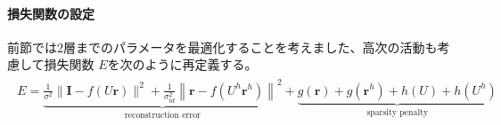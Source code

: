 \documentclass[letterpaper,10pt,english]{sphinxmanual}
\begin{document}
\paragraph{損失関数の設定}
\label{\detokenize{11-3_predictive-coding-rao:id3}}
前節では2層までのパラメータを最適化することを考えました、高次の活動も考慮して損失関数 \(E\)を次のように再定義する。
\begin{equation*}
\begin{split}
\begin{align}
E=\underbrace{\frac{1}{\sigma^{2}}\|\boldsymbol{I}-f(U \boldsymbol{r})\|^2+\frac{1}{\sigma_{t d}^{2}}\left\|\boldsymbol{r}-f(U^h \boldsymbol{r}^h)\right\|^2}_{\text{reconstruction error}}+\underbrace{g(\boldsymbol{r})+g(\boldsymbol{r}^{h})+h(U)+h(U^h)}_{\text{sparsity penalty}}\tag{8}
\end{align}
\end{split}
\end{equation*}
\end{document}
